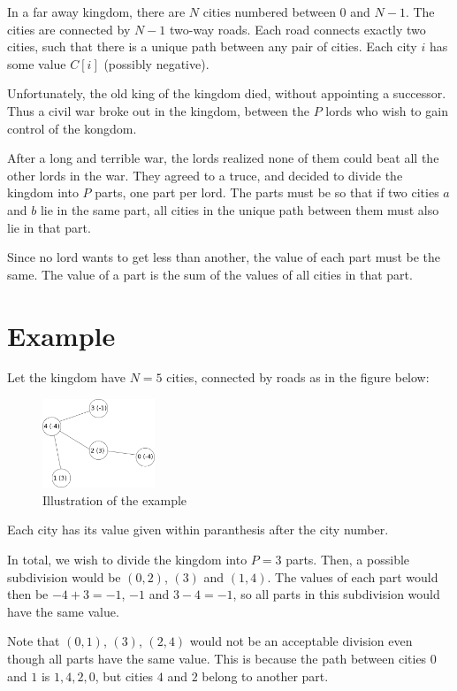 \newcommand\version{v2}
In a far away kingdom, there are $N$ cities numbered between $0$ and $N - 1$.
The cities are connected by $N - 1$ two-way roads.
Each road connects exactly two cities, such that there is a unique path between any pair of cities. Each city $i$ has some value $C[i]$ (possibly negative).

Unfortunately, the old king of the kingdom died, without appointing a successor. Thus a civil war broke out in the kingdom, between the $P$ lords who wish to gain control of the kongdom.

After a long and terrible war, the lords realized none of them could beat all the other lords in the war. They agreed to a truce, and decided to divide the kingdom into $P$ parts, one part per lord. The parts must be so that if two cities $a$ and $b$ lie in the same part, all cities in the unique path between them must also lie in that part.

Since no lord wants to get less than another, the value of each part must be the same. The value of a part is the sum of the values of all cities in that part.

\section*{Example}
Let the kingdom have $N = 5$ cities, connected by roads as in the figure below:
\begin{figure}[h!]
  \centering
  \includegraphics[width=0.3\textwidth]{sample.png}
  \caption{Illustration of the example}
\end{figure}
Each city has its value given within paranthesis after the city number.

In total, we wish to divide the kingdom into $P = 3$ parts.
Then, a possible subdivision would be $(0, 2)$, $(3)$ and $(1, 4)$.
The values of each part would then be $-4 + 3 = -1$, $-1$ and $3 - 4 = -1$,
so all parts in this subdivision would have the same value.

Note that $(0, 1)$, $(3)$, $(2, 4)$ would not be an acceptable division even
though all parts have the same value. This is because the path between cities
$0$ and $1$ is $1, 4, 2, 0$, but cities $4$ and $2$ belong to another part.


